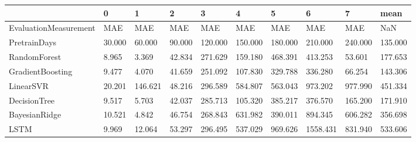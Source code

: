 \begin{tabular}{llllllllll}
\toprule
{} &      0 &       1 &      2 &       3 &       4 &       5 &        6 &       7 &    mean \\
\midrule
EvaluationMeasurement &    MAE &     MAE &    MAE &     MAE &     MAE &     MAE &      MAE &     MAE &     NaN \\
PretrainDays          & 30.000 &  60.000 & 90.000 & 120.000 & 150.000 & 180.000 &  210.000 & 240.000 & 135.000 \\
RandomForest          &  8.965 &   3.369 & 42.834 & 271.629 & 159.180 & 468.391 &  413.253 &  53.601 & 177.653 \\
GradientBoosting      &  9.477 &   4.070 & 41.659 & 251.092 & 107.830 & 329.788 &  336.280 &  66.254 & 143.306 \\
LinearSVR             & 20.201 & 146.621 & 48.216 & 296.589 & 584.807 & 563.043 &  973.202 & 977.990 & 451.334 \\
DecisionTree          &  9.517 &   5.703 & 42.037 & 285.713 & 105.320 & 385.217 &  376.570 & 165.200 & 171.910 \\
BayesianRidge         & 10.521 &   4.842 & 46.754 & 268.843 & 631.982 & 390.011 &  894.345 & 606.282 & 356.698 \\
LSTM                  &  9.969 &  12.064 & 53.297 & 296.495 & 537.029 & 969.626 & 1558.431 & 831.940 & 533.606 \\
\bottomrule
\end{tabular}
